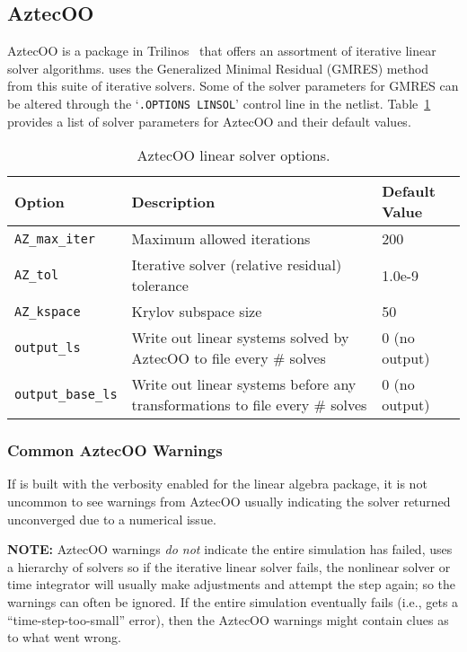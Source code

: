 \subsection{AztecOO}
AztecOO is a package in Trilinos~\cite{trilinos:toms} that offers an assortment of iterative linear solver algorithms.  
\Xyce{} uses the Generalized Minimal Residual (GMRES) method~\cite{sasc86} from this suite of iterative solvers.  
Some of the solver parameters for GMRES can be altered through the `\texttt{.OPTIONS LINSOL}' control line in the netlist. 
Table~\ref{tab:aztecoo:options} provides a list of solver parameters for AztecOO and their default values.

\begin{table}[htp]
\caption[AztecOO linear solver options.]{AztecOO linear solver options.}
\label{tab:aztecoo:options}
\begin{center}
\begin{tabular}{| p{3cm} | p{9cm} | p{2.5cm} |}
\hline
Option & Description & Default Value \\
\hline
{\tt AZ\_max\_iter}        & Maximum allowed iterations & 200 \\
{\tt AZ\_tol}              & Iterative solver (relative residual) tolerance & 1.0e-9 \\
{\tt AZ\_kspace}           & Krylov subspace size & 50 \\
{\tt output\_ls}           & Write out linear systems solved by AztecOO to file every \# solves & 0 (no output)\\
{\tt output\_base\_ls}     & Write out linear systems before any transformations to file every \# solves & 0 (no output)\\
\hline
\end{tabular}
\end{center}
\end{table}

\subsubsection{Common AztecOO Warnings}

If \Xyce{} is built with the verbosity enabled for the linear algebra package, it is not
uncommon to see warnings from AztecOO usually indicating the solver returned unconverged due to a numerical issue.

\begin{center}
\begin{minipage}{0.85\textwidth}
\color{XyceRed} {\bf NOTE:  }\color{black}  AztecOO warnings {\em do not} indicate the entire simulation has failed, \Xyce{} uses a hierarchy of solvers so if the iterative linear solver fails, the nonlinear solver or time integrator will usually make adjustments and attempt the step again; so the warnings can often be ignored. If the entire simulation eventually fails (i.e., gets a ``time-step-too-small'' error), then the AztecOO warnings might contain clues as to what went wrong.
\end{minipage}
\end{center}

